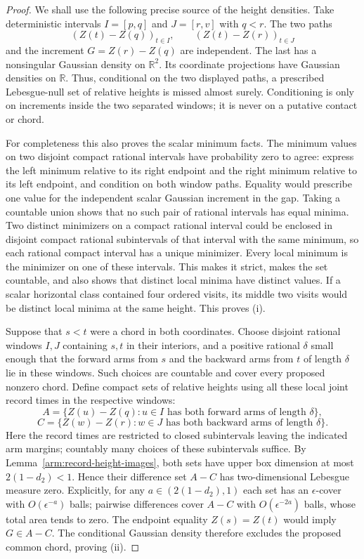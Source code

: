 \begin{proof}
We shall use the following precise source of the height densities.
Take deterministic intervals $I=[p,q]$ and $J=[r,v]$ with $q<r$.
The two paths
\[
 (Z(t)-Z(q))_{t\in I},\qquad (Z(t)-Z(r))_{t\in J}
\]
and the increment $G=Z(r)-Z(q)$ are independent.  The last has a
nonsingular Gaussian density on $\mathbb R^2$.  Its coordinate projections
have Gaussian densities on $\mathbb R$.  Thus, conditional on the two
displayed paths, a prescribed Lebesgue-null set of relative heights is
missed almost surely.  Conditioning is only on increments inside the
two separated windows; it is never on a putative contact or chord.

For completeness this also proves the scalar minimum facts.  The minimum
values on two disjoint compact rational intervals have probability zero
to agree: express the left minimum relative to its right endpoint and
the right minimum relative to its left endpoint, and condition on both
window paths.  Equality would prescribe one value for the independent
scalar Gaussian increment in the gap.  Taking a countable union shows
that no such pair of rational intervals has equal minima.  Two distinct
minimizers on a compact rational interval could be enclosed in disjoint
compact rational subintervals of that interval with the same minimum,
so each rational compact interval
has a unique minimizer.  Every local minimum is the minimizer on one
of these intervals.  This makes it strict, makes the set countable, and
also shows that distinct local minima have distinct values.  If a scalar
horizontal class contained four ordered visits, its middle two visits
would be distinct local minima at the same height.  This proves (i).

Suppose that $s<t$ were a chord in both coordinates.  Choose disjoint
rational windows $I,J$ containing $s,t$ in their interiors, and a
positive rational $\delta$ small enough that the forward arms from $s$
and the backward arms from $t$ of length $\delta$ lie in these windows.
Such choices are countable and cover every proposed nonzero chord.
Define compact sets of relative heights using all these local joint
record times in the respective windows:
\[
 A=\{Z(u)-Z(q):u\in I\text{ has both forward arms of length }\delta\},
\]
\[
 C=\{Z(w)-Z(r):w\in J\text{ has both backward arms of length }\delta\}.
\]
Here the record times are restricted to closed subintervals leaving
the indicated arm margins; countably many choices of these subintervals
suffice.  By Lemma~\ref{arm:record-height-images}, both sets have upper
box dimension at most $2(1-d_2)<1$.  Hence their difference set $A-C$
has two-dimensional Lebesgue measure zero.  Explicitly, for any
$a\in(2(1-d_2),1)$ each set has an $\epsilon$-cover with
$O(\epsilon^{-a})$ balls; pairwise differences cover $A-C$ with
$O(\epsilon^{-2a})$ balls, whose total area tends to zero.
The endpoint equality $Z(s)=Z(t)$ would imply $G\in A-C$.
The conditional Gaussian density therefore excludes the proposed
common chord, proving (ii).


\end{proof}
